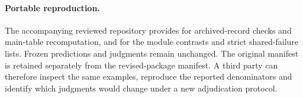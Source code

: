\paragraph{Portable reproduction.} The accompanying reviewed repository provides  for archived-record checks and main-table recomputation, and  for the module contrasts and strict shared-failure lists. Frozen predictions and judgments remain unchanged. The original manifest is retained separately from the revised-package manifest. A third party can therefore inspect the same examples, reproduce the reported denominators and identify which judgments would change under a new adjudication protocol.
